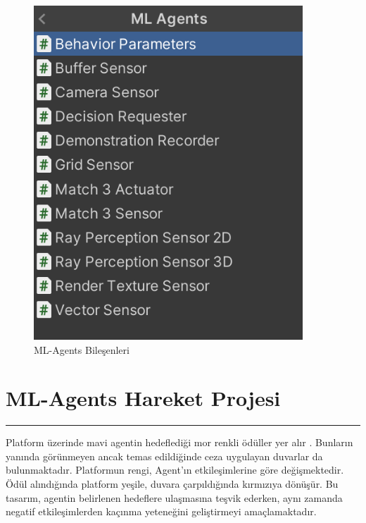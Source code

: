 \documentclass{article}
\begin{document}
\begin{figure}
    \begin{center}
        \includegraphics[width=0.9\textwidth]{mlagentcomponents.png}
    \end{center}
      \caption{ML-Agents Bileşenleri}
\end{figure}

\newpage

\section{ML-Agents Hareket Projesi}
\rule{\textwidth}{0.5pt}
Platform üzerinde mavi agentin hedeflediği mor renkli ödüller yer alır \cite{theashbot}. Bunların yanında görünmeyen ancak temas edildiğinde ceza uygulayan duvarlar da bulunmaktadır. Platformun rengi, Agent'ın etkileşimlerine göre değişmektedir. Ödül alındığında platform yeşile, duvara çarpıldığında kırmızıya dönüşür. Bu tasarım, agentin belirlenen hedeflere ulaşmasına teşvik ederken, aynı zamanda negatif etkileşimlerden kaçınma yeteneğini geliştirmeyi amaçlamaktadır. \\[5pt]
\end{document}
